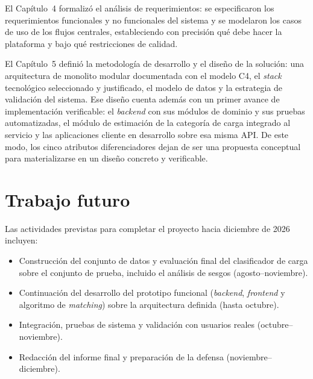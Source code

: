 {El Capítulo~4 formalizó el análisis de requerimientos: se especificaron los requerimientos funcionales y no funcionales del sistema y se modelaron los casos de uso de los flujos centrales, estableciendo con precisión qué debe hacer la plataforma y bajo qué restricciones de calidad.

El Capítulo~5 definió la metodología de desarrollo y el diseño de la solución: una arquitectura de monolito modular documentada con el modelo C4, el \emph{stack} tecnológico seleccionado y justificado, el modelo de datos y la estrategia de validación del sistema. Ese diseño cuenta además con un primer avance de implementación verificable: el \emph{backend} con sus módulos de dominio y sus pruebas automatizadas, el módulo de estimación de la categoría de carga integrado al servicio y las aplicaciones cliente en desarrollo sobre esa misma API. De este modo, los cinco atributos diferenciadores dejan de ser una propuesta conceptual para materializarse en un diseño concreto y verificable.

\section{Trabajo futuro}

Las actividades previstas para completar el proyecto hacia diciembre de 2026 incluyen:

\begin{itemize}[leftmargin=2em]
    \item Construcción del conjunto de datos y evaluación final del clasificador de carga sobre el conjunto de prueba, incluido el análisis de sesgos (agosto--noviembre).
    \item Continuación del desarrollo del prototipo funcional (\emph{backend}, \emph{frontend} y algoritmo de \emph{matching}) sobre la arquitectura definida (hasta octubre).
    \item Integración, pruebas de sistema y validación con usuarios reales (octubre--noviembre).
    \item Redacción del informe final y preparación de la defensa (noviembre--diciembre).
\end{itemize}
}%
